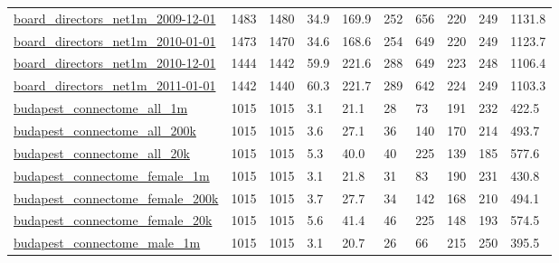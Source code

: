 \begin{longtable}{llllllllll}
 \href{http://www.boardsandgender.com/data.php}{board\_directors\_net1m\_2009-12-01}                                           & 1483       & 1480  & 34.9   & 169.9  & 252   & 656    & 220    & 249    & 1131.8  \\
 \href{http://www.boardsandgender.com/data.php}{board\_directors\_net1m\_2010-01-01}                                           & 1473       & 1470  & 34.6   & 168.6  & 254   & 649    & 220    & 249    & 1123.7  \\
 \href{http://www.boardsandgender.com/data.php}{board\_directors\_net1m\_2010-12-01}                                           & 1444       & 1442  & 59.9   & 221.6  & 288   & 649    & 223    & 248    & 1106.4  \\
 \href{http://www.boardsandgender.com/data.php}{board\_directors\_net1m\_2011-01-01}                                           & 1442       & 1440  & 60.3   & 221.7  & 289   & 642    & 224    & 249    & 1103.3  \\
 \href{http://pitgroup.org/connectome/}{budapest\_connectome\_all\_1m}                                                         & 1015       & 1015  & 3.1    & 21.1   & 28    & 73     & 191    & 232    & 422.5   \\
 \href{http://pitgroup.org/connectome/}{budapest\_connectome\_all\_200k}                                                       & 1015       & 1015  & 3.6    & 27.1   & 36    & 140    & 170    & 214    & 493.7   \\
 \href{http://pitgroup.org/connectome/}{budapest\_connectome\_all\_20k}                                                        & 1015       & 1015  & 5.3    & 40.0   & 40    & 225    & 139    & 185    & 577.6   \\
 \href{http://pitgroup.org/connectome/}{budapest\_connectome\_female\_1m}                                                      & 1015       & 1015  & 3.1    & 21.8   & 31    & 83     & 190    & 231    & 430.8   \\
 \href{http://pitgroup.org/connectome/}{budapest\_connectome\_female\_200k}                                                    & 1015       & 1015  & 3.7    & 27.7   & 34    & 142    & 168    & 210    & 494.1   \\
 \href{http://pitgroup.org/connectome/}{budapest\_connectome\_female\_20k}                                                     & 1015       & 1015  & 5.6    & 41.4   & 46    & 225    & 148    & 193    & 574.5   \\
 \href{http://pitgroup.org/connectome/}{budapest\_connectome\_male\_1m}                                                        & 1015       & 1015  & 3.1    & 20.7   & 26    & 66     & 215    & 250    & 395.5   \\

\end{longtable}
